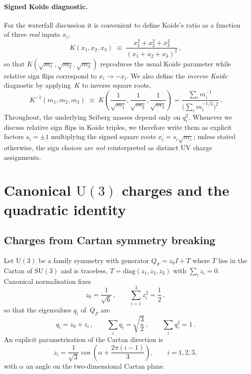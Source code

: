 \documentclass[11pt,a4paper]{article}
\newcommand{\SU}{\mathrm{SU}}
\newcommand{\UU}{\mathrm{U}}
\newcommand{\diag}{\mathrm{diag}}
\begin{document}
\paragraph{Signed Koide diagnostic.}
For the waterfall discussion it is convenient to define Koide's ratio as
a function of three \emph{real} inputs $x_i$,
\begin{equation}
  K(x_1,x_2,x_3)
  \;\equiv\;
  \frac{x_1^2+x_2^2+x_3^2}{(x_1+x_2+x_3)^2}\,,
  \label{eq:Kdef}
\end{equation}
so that $K(\sqrt{m_1},\sqrt{m_2},\sqrt{m_3})$ reproduces the usual Koide
parameter while relative sign flips correspond to $x_i\to -x_i$.  We also
define the \emph{inverse Koide} diagnostic by applying~$K$ to inverse square
roots,
\begin{equation}
  K^{-1}(m_1,m_2,m_3)
  \;\equiv\;
  K\!\left(\frac{1}{\sqrt{m_1}},\frac{1}{\sqrt{m_2}},\frac{1}{\sqrt{m_3}}\right)
  = \frac{\sum_i m_i^{-1}}{\bigl(\sum_i m_i^{-1/2}\bigr)^2}\,.
  \label{eq:Kinvdef}
\end{equation}
Throughout, the underlying Seiberg masses depend only on $q_i^2$.  Whenever we
discuss relative sign flips in Koide triples, we therefore write them as
explicit factors $s_i=\pm1$ multiplying the signed square roots
$x_i=s_i\sqrt{m_i}$; unless stated otherwise, the sign choices are \emph{not}
reinterpreted as distinct UV charge assignments.

\section{Canonical \texorpdfstring{$\UU(3)$}{U(3)} charges and the quadratic identity}
\label{sec:u3}

\subsection{Charges from Cartan symmetry breaking}
\label{sec:charges}

Let $\UU(3)$ be a family symmetry with generator
$Q_F=z_0 I + T$ where $T$ lies in the Cartan of $\SU(3)$ and is traceless,
$T=\diag(z_1,z_2,z_3)$ with $\sum_i z_i=0$.
Canonical normalisation fixes
\begin{equation}
  z_0=\frac{1}{\sqrt6}\,,
  \qquad
  \sum_{i=1}^3 z_i^2=\frac{1}{2}\,,
  \label{eq:canonical_norm}
\end{equation}
so that the eigenvalues $q_i$ of~$Q_F$ are
\begin{equation}
  q_i=z_0+z_i\,,
  \qquad
  \sum_i q_i=\sqrt{\frac{3}{2}}\,,
  \qquad
  \sum_i q_i^2=1\,.
  \label{eq:qsum}
\end{equation}
An explicit parametrisation of the Cartan direction is
\begin{equation}
  z_i=\frac{1}{\sqrt3}\cos\!\left(\alpha+\frac{2\pi(i-1)}{3}\right),
  \qquad i=1,2,3,
  \label{eq:zi_alpha}
\end{equation}
with $\alpha$ an angle on the two-dimensional Cartan plane.
\end{document}
